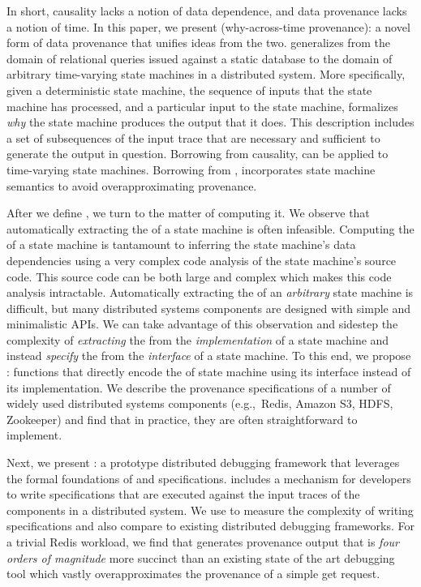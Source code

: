In short, causality lacks a notion of data dependence, and data provenance
lacks a notion of time. In this paper, we present 
(why-across-time provenance): a novel form of data provenance that unifies
ideas from the two. \Watprovenance{} generalizes \whyprovenance{} from the
domain of relational queries issued against a static database to the domain of
arbitrary time-varying state machines in a distributed system. More
specifically, given a deterministic state machine, the sequence of inputs that
the state machine has processed, and a particular input to the state machine,
\watprovenance{} formalizes \emph{why} the state machine produces the output
that it does. This description includes a set of subsequences of the input
trace that are necessary and sufficient to generate the output in
question. Borrowing from causality, \watprovenance{} can be applied to
time-varying state machines. Borrowing from \whyprovenance{}, \watprovenance{}
incorporates state machine semantics to avoid overapproximating provenance.

After we define \watprovenance{}, we turn to the matter of computing it. We
observe that automatically extracting the \watprovenance{} of a state machine
is often infeasible. Computing the \watprovenance{} of a state machine is
tantamount to inferring the state machine's data dependencies using a very
complex code analysis of the state machine's source code. This source code can
be both large and complex which makes this code analysis intractable.
%
Automatically extracting the \watprovenance{} of an \emph{arbitrary} state
machine is difficult, but many distributed systems components are designed with
simple and minimalistic APIs. We can take advantage of this observation and
sidestep the complexity of \emph{extracting} the \watprovenance{} from the
\emph{implementation} of a state machine and instead \emph{specify} the
\watprovenance{} from the \emph{interface} of a state machine. To this end, we
propose : functions that directly
encode the \watprovenance{} of state machine using its interface instead of its
implementation. We describe the provenance specifications of a number of widely
used distributed systems components (e.g.,\ Redis, Amazon S3, HDFS, Zookeeper)
and find that in practice, they are often straightforward to implement.

Next, we present \fluent{}: a prototype distributed debugging framework that
leverages the formal foundations of \watprovenance{} and \watprovenance{}
specifications. \fluent{} includes a mechanism for developers to write
\watprovenance{} specifications that are executed against the input traces of
the components in a distributed system. We use \fluent{} to measure the
complexity of writing \watprovenance{} specifications and also compare
\fluent{} to existing distributed debugging frameworks. For a trivial Redis
workload, we find that \fluent{} generates provenance output that is \emph{four
orders of magnitude} more succinct than an existing state of the art debugging
tool which vastly overapproximates the provenance of a simple get request.

